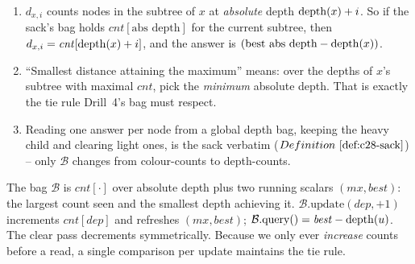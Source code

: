 \begin{enumerate}[nosep,leftmargin=1.6em]
  \item \(d_{x,i}\) counts nodes in the subtree of \(x\) at \emph{absolute}
        depth \(\operatorname{depth}(x)+i\). So if the sack's bag holds
        \(\mathit{cnt}[\text{abs depth}]\) for the current subtree, then
        \(d_{x,i}=\mathit{cnt}[\operatorname{depth}(x)+i]\), and the answer is
        \((\text{best abs depth}-\operatorname{depth}(x))\).
  \item ``Smallest distance attaining the maximum'' means: over the depths of
        \(x\)'s subtree with maximal \(\mathit{cnt}\), pick the \emph{minimum}
        absolute depth. That is exactly the tie rule Drill~4's bag must respect.
  \item Reading one answer per node from a global depth bag, keeping the heavy
        child and clearing light ones, is the sack verbatim (\(\defref{c28-sack}\))
        -- only \(\mathcal{B}\) changes from colour-counts to depth-counts.
\end{enumerate}

The bag \(\mathcal{B}\) is \(\mathit{cnt}[\cdot]\) over absolute depth plus two
running scalars \((\mathit{mx},\mathit{best})\): the largest count seen and the
smallest depth achieving it. \(\mathcal{B}.\mathrm{update}(\mathit{dep},+1)\)
increments \(\mathit{cnt}[\mathit{dep}]\) and refreshes \((\mathit{mx},
\mathit{best})\); \(\mathcal{B}.\mathrm{query}()=\mathit{best}-\operatorname{depth}(u)\).
The clear pass decrements symmetrically. Because we only ever \emph{increase}
counts before a read, a single comparison per update maintains the tie rule.

